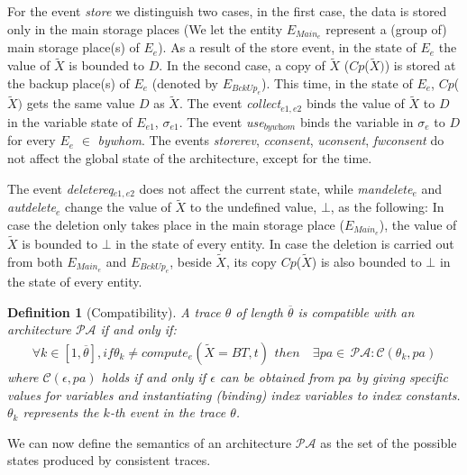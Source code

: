 \documentclass[a4paper]{article}
\newtheorem{ttd}{Definition}
\begin{document}
For the event \textit{store} we distinguish two cases, in the first case, the data is stored only in the main storage places (We let the entity $E_{\textit{Main}_e}$ represent a (group of) main storage place(s) of $E_e$). As a result of the store event, in the state of $E_e$ the value of $\tilde{X}$ is bounded to $D$.  In the second case, a copy of $\tilde{X}$ ($Cp$($\tilde{X})$) is stored at the backup place(s) of $E_e$  (denoted by $E_{\textit{BckUp}_e}$). This time, in the state of $E_e$, $Cp$($\tilde{X})$ gets the same value $D$ as $\tilde{X}$. The event \textit{collect}$_{e1, e2}$  binds the value of $\tilde{X}$ to $D$ in the variable state of $E_{e1}$, $\sigma_{e1}$. The event \textit{use}$_{\textit{bywhom}}$ binds the variable in $\sigma_{e}$ to $D$ for every $E_e$ $\in$ \textit{bywhom}. The events \textit{storerev}, \textit{cconsent}, \textit{uconsent}, \textit{fwconsent} do not affect the global state of the architecture, except for the time.       

The event \textit{deletereq}$_{e1,e2}$ does not affect the current state, while \textit{mandelete}$_{e}$ and \textit{autdelete}$_{e}$ change the value of $\tilde{X}$ to the undefined value, $\bot$, as the following: In case the deletion only takes place in the main storage place ($E_{\textit{Main}_e}$), the value of $\tilde{X}$ is bounded to $\bot$ in the state of every entity. In case the deletion is carried out from both $E_{\textit{Main}_e}$ and $E_{\textit{BckUp}_e}$, beside $\tilde{X}$, its copy $Cp$($\tilde{X}$) is also bounded to $\bot$ in the state of every entity. 
 
\begin{ttd}[Compatibility] A trace $\theta$ of length $\overline{\theta}$  is  compatible with an architecture $\mathcal{P}\mathcal{A}$ if and only if:
\begin{align*}
\forall k \in [1,\overline{\theta}], if \theta_k \neq compute_e(\tilde{X} = BT, t)\, \ then\ & \exists pa \in\, \mathcal{P}\mathcal{A}: \mathcal{C} (\theta_k, pa)
\end{align*}
where $\mathcal{C} (\epsilon, pa)$ holds if and only if $\epsilon$ can be obtained from $pa$ by giving specific values for variables and instantiating (binding) index variables to index constants. $\theta_k$ represents the $k$-th event in the trace $\theta$.  
\end{ttd}

We can now define the semantics of an architecture $\mathcal{P}\mathcal{A}$ as the set of the possible states produced by consistent traces. 
\end{document}
